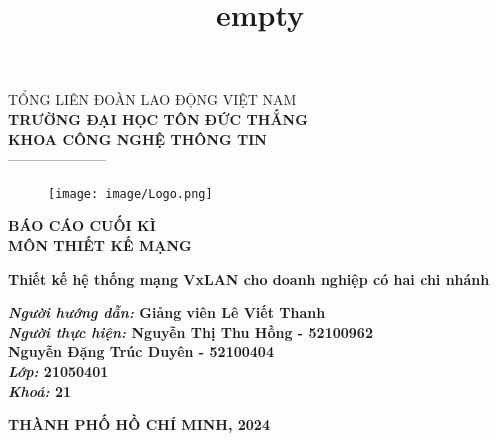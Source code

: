 \documentclass[13pt]{article}
\title{empty}
\begin{document}
	\fontsize{14pt}{20pt}\selectfont
	\begin{center}
		TỔNG LIÊN ĐOÀN LAO ĐỘNG VIỆT NAM \\\textbf{TRƯỜNG ĐẠI HỌC TÔN ĐỨC THẮNG}\\
        \textbf{KHOA CÔNG NGHỆ THÔNG TIN}\\
		---------------------
	\end{center}
	\vspace{1cm}
	\begin{figure}[h]
		\centering
		\texttt{[image: image/Logo.png]}
	\end{figure}
	\vspace{-1cm}
	\vspace{1cm}
	\fontsize{20pt}{20pt}\selectfont
	\begin{center}
		\textbf{BÁO CÁO CUỐI KÌ}\\
        \textbf{MÔN THIẾT KẾ MẠNG}
	\end{center}
	\vspace{0.5cm}
	\fontsize{16pt}{20pt}\selectfont
	\begin{center}\Huge
		\textbf{Thiết kế hệ thống mạng VxLAN cho doanh nghiệp có hai chi nhánh}	
	\end{center}
    \vspace{0.5cm}
	\fontsize{16pt}{20pt}\selectfont
	\begin{flushright}\Large
		\textbf{\textbf{\textit{Người hướng dẫn: }\textbf{Giảng viên Lê Viết Thanh }}
        \\\textbf{\textit{Người thực hiện: }\textbf{Nguyễn Thị Thu Hồng - 52100962
        \\Nguyễn Đặng Trúc Duyên - 52100404}}\\
        \textbf{\textit{Lớp: }\textbf{21050401}}\\
        \textbf{\textit{Khoá: }\textbf{21}}
        }
	\end{flushright}
	\vspace{2cm}
	\fontsize{16pt}{20pt}\selectfont
	\begin{center}
		\textbf{THÀNH PHỐ HỒ CHÍ MINH, 2024}
	\end{center}
\end{document}
